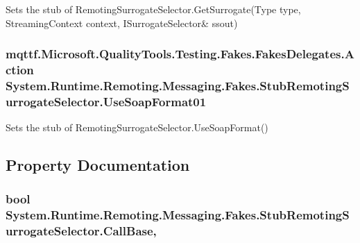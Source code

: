 Sets the stub of Remoting\-Surrogate\-Selector.\-Get\-Surrogate(Type type, Streaming\-Context context, I\-Surrogate\-Selector\& ssout)

\hypertarget{class_system_1_1_runtime_1_1_remoting_1_1_messaging_1_1_fakes_1_1_stub_remoting_surrogate_selector_a68c50b5cf05fb965e5dd75a1afa8b27c}{
\subsubsection[{Use\-Soap\-Format01}]{\setlength{\rightskip}{0pt plus 5cm}mqttf.\-Microsoft.\-Quality\-Tools.\-Testing.\-Fakes.\-Fakes\-Delegates.\-Action System.\-Runtime.\-Remoting.\-Messaging.\-Fakes.\-Stub\-Remoting\-Surrogate\-Selector.\-Use\-Soap\-Format01}}\label{class_system_1_1_runtime_1_1_remoting_1_1_messaging_1_1_fakes_1_1_stub_remoting_surrogate_selector_a68c50b5cf05fb965e5dd75a1afa8b27c}


Sets the stub of Remoting\-Surrogate\-Selector.\-Use\-Soap\-Format()



\subsection{Property Documentation}
\hypertarget{class_system_1_1_runtime_1_1_remoting_1_1_messaging_1_1_fakes_1_1_stub_remoting_surrogate_selector_ad55dccf2d0a4185c66c59a1b2ccb3015}{
\subsubsection[{Call\-Base}]{\setlength{\rightskip}{0pt plus 5cm}bool System.\-Runtime.\-Remoting.\-Messaging.\-Fakes.\-Stub\-Remoting\-Surrogate\-Selector.\-Call\-Base\hspace{0.3cm}{\ttfamily [get]}, {\ttfamily [set]}}}\label{class_system_1_1_runtime_1_1_remoting_1_1_messaging_1_1_fakes_1_1_stub_remoting_surrogate_selector_ad55dccf2d0a4185c66c59a1b2ccb3015}


